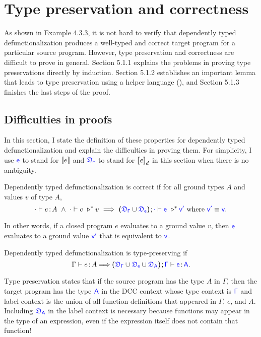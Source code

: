 
\section{Type preservation and correctness}
As shown in Example 4.3.3, it is not hard to verify that dependently typed defunctionalization produces a well-typed and correct target program for a particular source program. However, type preservation and correctness are difficult to prove in general. Section 5.1.1 explains the problems in proving type preservations directly by induction. Section 5.1.2 establishes an important lemma that leads to type preservation using a helper language (\ccs), and Section 5.1.3 finishes the last steps of the proof.

\subsection{Difficulties in proofs}
In this section, I state the definition of these properties for dependently typed defunctionalization and explain the difficulties in proving them.
For simplicity, I use $\target{e}$ to stand for ${[\![ e ]\!]}$ and $\target{\fdef_e}$ to stand for ${[\![ e ]\!]}_d$ in this section when there is no ambiguity.

\begin{definition}
Dependently typed defunctionalization is correct if for all ground types $A$ and values $v$ of type $A$,
\begin{equation*}
	\cdot \vdash e \goodcolon A \ \land \
	\cdot \vdash e\ \triangleright^* v\ \Longrightarrow\ 
	\sfpl \target{\fdef_{\Gamma}} \cup \target{\fdef_{e}} \sfpr \semicolon \target{\cdot} \vdash \target{e}\ \triangleright^* \target{v'} \text{ where } \target{v'} \equiv \target{v}.
\end{equation*}
\end{definition}
In other words, if a closed program $e$ evaluates to a ground value $v$, then $\target{e}$ evaluates to a ground value $\target{v'}$ that is equivalent to $\target{v}$.

\begin{definition}
Dependently typed defunctionalization is type-preserving if
\begin{equation*}
	\Gamma \vdash e \goodcolon A \Longrightarrow 
	\sfpl \target{\fdef_{\Gamma}} \cup \target{\fdef_{e}} \cup \target{\fdef_{A}} \sfpr \semicolon \target{\Gamma} \vdash \target{e} \goodcolon \target{A}.
\end{equation*}
\end{definition}
Type preservation states that if the source program has the type $A$ in $\Gamma$, then the target program has the type $\target{A}$ in the DCC context whose type context is $\target{\Gamma}$ and label context is the union of all function definitions that appeared in $\Gamma$, $e$, and $A$. Including $\target{\fdef_A}$ in the label context is necessary because functions may appear in the type of an expression, even if the expression itself does not contain that function! 

